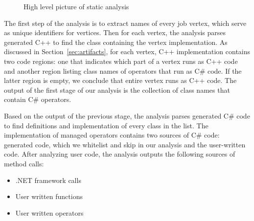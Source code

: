 \begin{figure}[ht]


\caption{High level picture of static analysis}
\label{fig:analysis}
\end{figure}

The first step of the analysis is to extract names of every job vertex, which serve as unique identifiers for vertices. Then for each vertex, the analysis parses generated C++ to find the class containing the vertex implementation. As discussed in Section~\ref{sec:artifacts}, for each vertex, C++ implementation contains two code regions: one that indicates which part of a vertex runs as C++ code and another region listing class names of operators that run as C\# code. If the latter region is empty, we conclude that entire vertex runs as C++ code. The output of the first stage of our analysis is the collection of class names that contain C\# operators.

Based on the output of the previous stage, the analysis parses generated C\# code to find definitions and implementation of every class in the list. The implementation of managed operators contains two sources of C\# code: generated code, which we whitelist and skip in our analysis and the user-written code. After analyzing user code, the analysis outputs the following sources of method calls:
\begin{itemize}
\item .NET framework calls
\item User written functions
\item User written operators 
\end{itemize}

